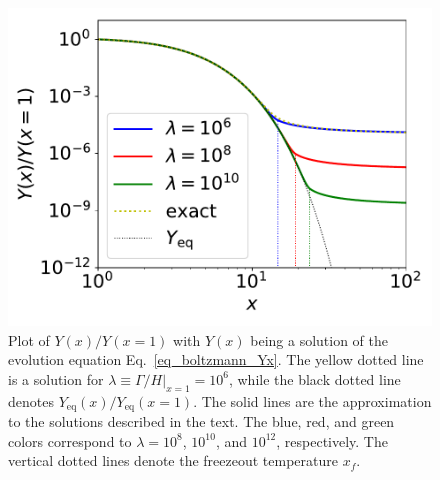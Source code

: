 \documentclass[12pt,twoside,book]{article}
\begin{document}
\begin{figure}[t]
 \centering \includegraphics[width=0.5\hsize]{figure/DMrelic.pdf}
 \caption{Plot of $Y(x) / Y(x=1)$ with $Y(x)$ being a solution of the
 evolution equation Eq.~\eqref{eq_boltzmann_Yx}.  The yellow dotted
 line is a solution for $\lambda \equiv \left. \Gamma / H
 \right|_{x=1} = 10^6$, while the black dotted line denotes
 $Y_{\mathrm{eq}} (x) / Y_{\mathrm{eq}} (x=1)$.  The solid lines are
 the approximation to the solutions described in the text.  The blue,
 red, and green colors correspond to $\lambda = 10^8$, $10^{10}$, and
 $10^{12}$, respectively.  The vertical dotted lines denote the
 freezeout temperature $x_f$.}  \label{fig_DM_relic}
\end{figure}
\end{document}
